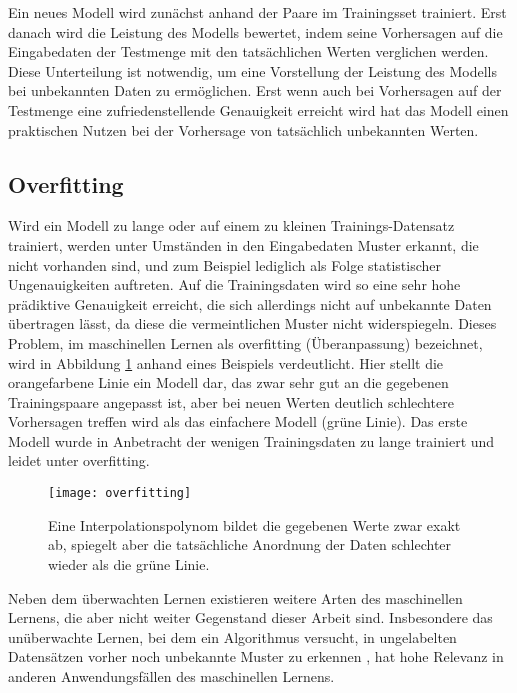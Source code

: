Ein neues Modell wird zunächst anhand der Paare im Trainingsset trainiert. Erst danach wird die Leistung des Modells bewertet, indem seine Vorhersagen auf die Eingabedaten der Testmenge mit den tatsächlichen Werten verglichen werden. Diese Unterteilung ist notwendig, um eine Vorstellung der Leistung des Modells bei unbekannten Daten zu ermöglichen. Erst wenn auch bei Vorhersagen auf der Testmenge eine zufriedenstellende Genauigkeit erreicht wird hat das Modell einen praktischen Nutzen bei der Vorhersage von tatsächlich unbekannten Werten.

\subsection{Overfitting}\label{section:overfitting}
Wird ein Modell zu lange oder auf einem zu kleinen Trainings-Datensatz trainiert, werden unter Umständen in den Eingabedaten Muster erkannt, die nicht vorhanden sind, und zum Beispiel lediglich als Folge statistischer Ungenauigkeiten auftreten. Auf die Trainingsdaten wird so eine sehr hohe prädiktive Genauigkeit erreicht, die sich allerdings nicht auf unbekannte Daten übertragen lässt, da diese die vermeintlichen Muster nicht widerspiegeln. Dieses Problem, im maschinellen Lernen als overfitting (Überanpassung) bezeichnet, wird in Abbildung \ref{fig:overfitting} anhand eines Beispiels verdeutlicht. Hier stellt die orangefarbene Linie ein Modell dar, das zwar sehr gut an die gegebenen Trainingspaare angepasst ist, aber bei neuen Werten deutlich schlechtere Vorhersagen treffen wird als das einfachere Modell (grüne Linie). Das erste Modell wurde in Anbetracht der wenigen Trainingsdaten zu lange trainiert und leidet unter overfitting.

\begin{figure}[htb]
    \centering
    \texttt{[image: overfitting]}
    \caption{Eine Interpolationspolynom bildet die gegebenen Werte zwar exakt ab, spiegelt aber die tatsächliche Anordnung der Daten schlechter wieder als die grüne Linie.}
    \label{fig:overfitting}
\end{figure} %

Neben dem überwachten Lernen existieren weitere Arten des maschinellen Lernens, die aber nicht weiter Gegenstand dieser Arbeit sind. Insbesondere das unüberwachte Lernen, bei dem ein Algorithmus versucht, in ungelabelten Datensätzen vorher noch unbekannte Muster zu erkennen \citep{russellArtificialIntelligenceModern2020}, hat hohe Relevanz in anderen Anwendungsfällen des maschinellen Lernens.

